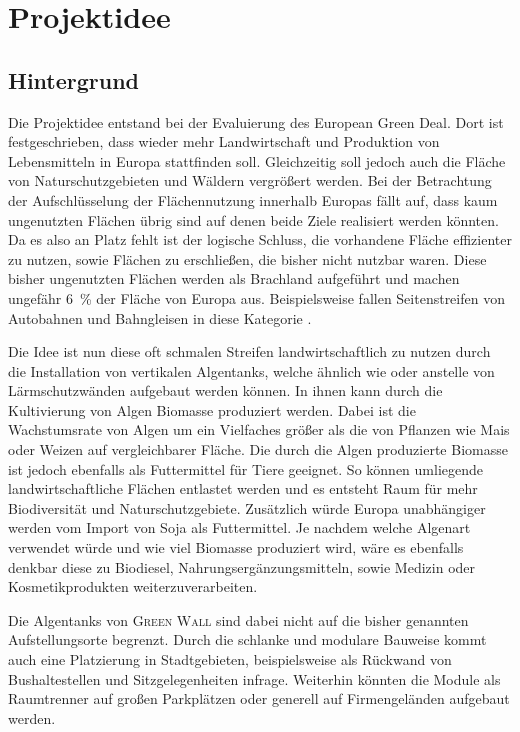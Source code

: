 \chapter{Projektidee}

\section{Hintergrund}

Die Projektidee entstand bei der Evaluierung des European Green Deal.
Dort ist festgeschrieben, dass wieder mehr Landwirtschaft und Produktion von Lebensmitteln in Europa stattfinden soll.
Gleichzeitig soll jedoch auch die Fläche von Naturschutzgebieten und Wäldern vergrößert werden.
Bei der Betrachtung der Aufschlüsselung der Flächennutzung innerhalb Europas fällt auf, dass kaum ungenutzten Flächen übrig sind auf denen beide Ziele realisiert werden könnten.
Da es also an Platz fehlt ist der logische Schluss, die vorhandene Fläche effizienter zu nutzen, sowie Flächen zu erschließen, die bisher nicht nutzbar waren.
Diese bisher ungenutzten Flächen werden als Brachland aufgeführt und machen ungefähr \qty{6}{\percent} der Fläche von Europa aus.
Beispielsweise fallen Seitenstreifen von Autobahnen und Bahngleisen in diese Kategorie \cite{Legislation2019.DerEuropaeischeGrueneDeal,Legislation2020.EUBiodiversitaetsstrategieFuer2030,Online.DieGemeinsameAgrarpolitikAufEinenBlick}.\par\medskip
%
Die Idee ist nun diese oft schmalen Streifen landwirtschaftlich zu nutzen durch die Installation von vertikalen Algentanks, welche ähnlich wie oder anstelle von Lärmschutzwänden aufgebaut werden können.
In ihnen kann durch die Kultivierung von Algen Biomasse produziert werden.
Dabei ist die Wachstumsrate von Algen um ein Vielfaches größer als die von Pflanzen wie Mais oder Weizen auf vergleichbarer Fläche.
Die durch die Algen produzierte Biomasse ist jedoch ebenfalls als Futtermittel für Tiere geeignet.
So können umliegende landwirtschaftliche Flächen entlastet werden und es entsteht Raum für mehr Biodiversität und Naturschutzgebiete.
Zusätzlich würde Europa unabhängiger werden vom Import von Soja als Futtermittel.
Je nachdem welche Algenart verwendet würde und wie viel Biomasse produziert wird, wäre es ebenfalls denkbar diese zu Biodiesel, Nahrungsergänzungsmitteln, sowie Medizin oder Kosmetikprodukten weiterzuverarbeiten.\par\medskip

Die Algentanks von \textsc{Green Wall} sind dabei nicht auf die bisher genannten Aufstellungsorte begrenzt.
Durch die schlanke und modulare Bauweise kommt auch eine Platzierung in Stadtgebieten, beispielsweise als Rückwand von Bushaltestellen und Sitzgelegenheiten infrage.
Weiterhin könnten die Module als Raumtrenner auf großen Parkplätzen oder generell auf Firmengeländen aufgebaut werden.\par\medskip

